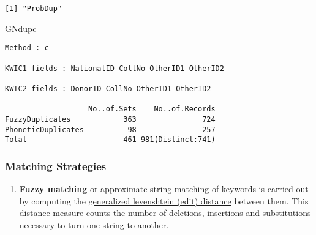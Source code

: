 \documentclass[
]{article}
\newenvironment{Shaded}{\begin{snugshade}}{\end{snugshade}}
\newcommand{\NormalTok}[1]{#1}
\providecommand{\tightlist}{%
  \setlength{\itemsep}{0pt}\setlength{\parskip}{0pt}}
\begin{document}
\begin{verbatim}
[1] "ProbDup"
\end{verbatim}

\begin{Shaded}
\begin{Highlighting}[]
\NormalTok{GNdupc}
\end{Highlighting}
\end{Shaded}

\begin{verbatim}
Method : c

KWIC1 fields : NationalID CollNo OtherID1 OtherID2

KWIC2 fields : DonorID CollNo OtherID1 OtherID2
 
                   No..of.Sets    No..of.Records
FuzzyDuplicates            363               724
PhoneticDuplicates          98               257
Total                      461 981(Distinct:741)
\end{verbatim}

\hypertarget{matching-strategies}{%
\subsubsection{Matching Strategies}\label{matching-strategies}}

\begin{enumerate}
\def\labelenumi{\arabic{enumi}.}
\tightlist
\item
  \textbf{Fuzzy matching} or approximate string matching of keywords is
  carried out by computing the
  \href{https://en.wikipedia.org/wiki/Levenshtein_distance}{generalized
  levenshtein (edit) distance} between them. This distance measure
  counts the number of deletions, insertions and substitutions necessary
  to turn one string to another.
\end{enumerate}
\end{document}
